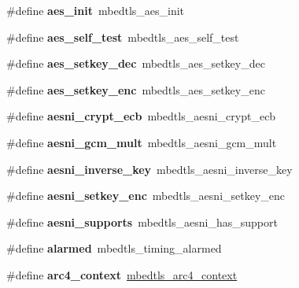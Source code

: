 \begin{DoxyCompactItemize}
\#define {\bfseries aes\+\_\+init}~mbedtls\+\_\+aes\+\_\+init
\item 
\mbox{\label{compat-1_83_8h_a0d0e19c4badb950f97009b4281e96a7b}} 
\#define {\bfseries aes\+\_\+self\+\_\+test}~mbedtls\+\_\+aes\+\_\+self\+\_\+test
\item 
\mbox{\label{compat-1_83_8h_a591da478bdc8bd8a620ae6af68892c31}} 
\#define {\bfseries aes\+\_\+setkey\+\_\+dec}~mbedtls\+\_\+aes\+\_\+setkey\+\_\+dec
\item 
\mbox{\label{compat-1_83_8h_ad65f0c52cd996944d578a41a5c7e2b24}} 
\#define {\bfseries aes\+\_\+setkey\+\_\+enc}~mbedtls\+\_\+aes\+\_\+setkey\+\_\+enc
\item 
\mbox{\label{compat-1_83_8h_a593372a1f266bf3386eaba604d405b76}} 
\#define {\bfseries aesni\+\_\+crypt\+\_\+ecb}~mbedtls\+\_\+aesni\+\_\+crypt\+\_\+ecb
\item 
\mbox{\label{compat-1_83_8h_aba44b06e60793789c214951083caf569}} 
\#define {\bfseries aesni\+\_\+gcm\+\_\+mult}~mbedtls\+\_\+aesni\+\_\+gcm\+\_\+mult
\item 
\mbox{\label{compat-1_83_8h_aabc641a95604a168a51c352bf6bc6654}} 
\#define {\bfseries aesni\+\_\+inverse\+\_\+key}~mbedtls\+\_\+aesni\+\_\+inverse\+\_\+key
\item 
\mbox{\label{compat-1_83_8h_a21304741198078dbb09d71b25c925c89}} 
\#define {\bfseries aesni\+\_\+setkey\+\_\+enc}~mbedtls\+\_\+aesni\+\_\+setkey\+\_\+enc
\item 
\mbox{\label{compat-1_83_8h_adf82de77e0748348d87b5ddcafed2501}} 
\#define {\bfseries aesni\+\_\+supports}~mbedtls\+\_\+aesni\+\_\+has\+\_\+support
\item 
\mbox{\label{compat-1_83_8h_ad1f27dc155fcc9af286ff1e9f9a727ba}} 
\#define {\bfseries alarmed}~mbedtls\+\_\+timing\+\_\+alarmed
\item 
\mbox{\label{compat-1_83_8h_a30de67b85f2861f6048416a4386647c5}} 
\#define {\bfseries arc4\+\_\+context}~\mbox{\hyperlink{structmbedtls__arc4__context}{mbedtls\+\_\+arc4\+\_\+context}}

\end{DoxyCompactItemize}
